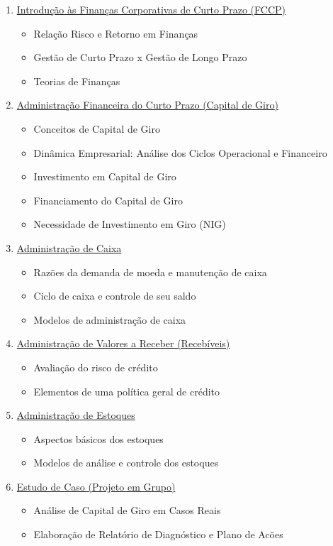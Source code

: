 \documentclass[
  a4paper,
]{book}
\begin{document}
\begin{enumerate}
\def\labelenumi{\arabic{enumi}.}
\item
  \hyperref[sec-intro]{Introdução às Finanças Corporativas de Curto
  Prazo (FCCP)}

  \begin{itemize}
  \item
    Relação Risco e Retorno em Finanças
  \item
    Gestão de Curto Prazo x Gestão de Longo Prazo
  \item
    Teorias de Finanças
  \end{itemize}
\item
  \hyperref[sec-giro]{Administração Financeira do Curto Prazo (Capital
  de Giro)}

  \begin{itemize}
  \item
    Conceitos de Capital de Giro
  \item
    Dinâmica Empresarial: Análise dos Ciclos Operacional e Financeiro
  \item
    Investimento em Capital de Giro
  \item
    Financiamento do Capital de Giro
  \item
    Necessidade de Investimento em Giro (NIG)
  \end{itemize}
\item
  \hyperref[sec-caixa]{Administração de Caixa}

  \begin{itemize}
  \item
    Razões da demanda de moeda e manutenção de caixa
  \item
    Ciclo de caixa e controle de seu saldo
  \item
    Modelos de administração de caixa
  \end{itemize}
\item
  \hyperref[sec-credito]{Administração de Valores a Receber
  (Recebíveis)}

  \begin{itemize}
  \item
    Avaliação do risco de crédito
  \item
    Elementos de uma política geral de crédito
  \end{itemize}
\item
  \hyperref[sec-estoque]{Administração de Estoques}

  \begin{itemize}
  \item
    Aspectos básicos dos estoques
  \item
    Modelos de análise e controle dos estoques
  \end{itemize}
\item
  \hyperref[sec-aval]{Estudo de Caso (Projeto em Grupo)}

  \begin{itemize}
  \item
    Análise de Capital de Giro em Casos Reais
  \item
    Elaboração de Relatório de Diagnóstico e Plano de Acões
  \end{itemize}
\end{enumerate}
\end{document}

